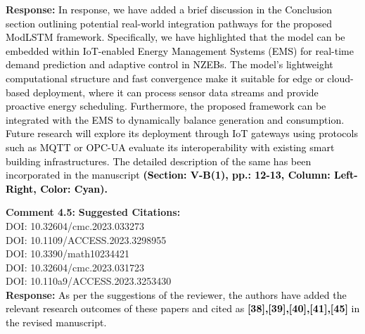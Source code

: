 \documentclass[12pt]{article}
\begin{document}
\hspace{-1.5em}\textbf{Response:}
\noindent\textcolor{black}{In response, we have added a brief discussion in the Conclusion section outlining potential real-world integration pathways for the proposed ModLSTM framework. Specifically, we have highlighted that the model can be embedded within IoT-enabled Energy Management Systems (EMS) for real-time demand prediction and adaptive control in NZEBs.}\newline
\noindent\textcolor{black}{The model’s lightweight computational structure and fast convergence make it suitable for edge or cloud-based deployment, where it can process sensor data streams and provide proactive energy scheduling. Furthermore, the proposed framework can be integrated with the EMS to dynamically balance generation and consumption. Future research will explore its deployment through IoT gateways using protocols such as MQTT or OPC-UA evaluate its interoperability with existing smart building infrastructures.}
\noindent\textcolor{black}{ The detailed description of the
same has been incorporated in the manuscript \textbf{(Section: V-B(1), pp.: 12-13, Column: Left-Right, Color: Cyan).}}\newline




\noindent\textbf{Comment 4.5:} \textbf{Suggested Citations:} \\
DOI: 10.32604/cmc.2023.033273 \\
DOI: 10.1109/ACCESS.2023.3298955 \\
DOI: 10.3390/math10234421 \\
DOI: 10.32604/cmc.2023.031723 \\
DOI: 10.110a9/ACCESS.2023.3253430 \\

\hspace{-1.5em}\textbf{Response:} \noindent\textcolor{black}{As per the suggestions of the reviewer, the authors  have added the relevant research outcomes
of these papers and cited as \textbf{[38],[39],[40],[41],[45]} in the revised manuscript.}\newline
\newline
\end{document}
